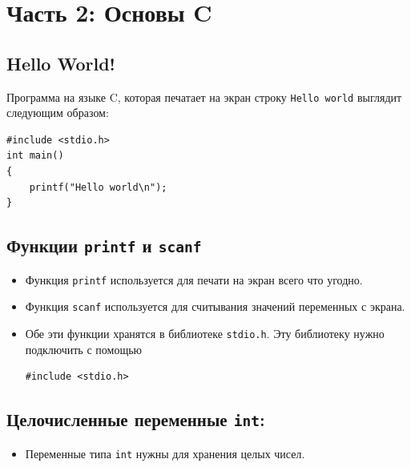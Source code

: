 \documentclass{article}
\begin{document}
\newpage
\section*{Часть 2: Основы C}
\subsection*{Hello World!}
Программа на языке C, которая печатает на экран строку \texttt{Hello world} выглядит следующим образом:
\begin{lstlisting}
#include <stdio.h>
int main() 
{
    printf("Hello world\n");
}
\end{lstlisting}


\subsection*{Функции \texttt{printf} и \texttt{scanf}}
\begin{itemize}
\item Функция \texttt{printf} используется для печати на экран всего что угодно.
\item Функция \texttt{scanf} используется для считывания значений переменных с экрана.
\item Обе эти функции хранятся в библиотеке \texttt{stdio.h}. Эту библиотеку нужно подключить с помощью
\begin{lstlisting}
#include <stdio.h>
\end{lstlisting}
\end{itemize}

\subsection*{Целочисленные переменные \texttt{int}:}
\begin{itemize}
\item Переменные типа \texttt{int} нужны для хранения целых чисел.
\end{itemize}
\end{document}
